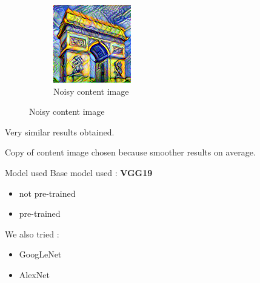\documentclass[12pt]{beamer}
\begin{document}
\begin{frame}
\begin{figure}[H]
\begin{subfigure}[b]{0.45\textwidth}
                \includegraphics[width=\textwidth]{resources/gatys/inputs/sun-trees-paris-noisy.png}
                \caption{Noisy content image}
            \end{subfigure}
        \end{figure}
        
        Very similar results obtained.
        
        \footnotesize{Copy of content image chosen because smoother results on average.}
    \end{frame}
    
    \begin{frame}{Model used}
        Base model used : {\bf VGG19}
        
        \begin{itemize}
            \item not pre-trained
            \item pre-trained
        \end{itemize}
        
        We also tried :
        
        \begin{itemize}
            \item GoogLeNet
            \item AlexNet
        \end{itemize}
    \end{frame}
    
\end{document}
